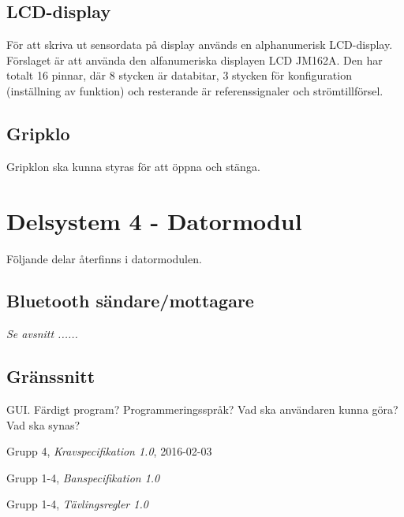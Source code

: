 \documentclass[11pt]{article}
\begin{document}
\begin{flushleft}
\subsection{LCD-display}
För att skriva ut sensordata på display används en alphanumerisk LCD-display. Förslaget är att använda den alfanumeriska displayen LCD JM162A. Den har totalt 16 pinnar, där 8 stycken är databitar, 3 stycken för konfiguration (inställning av funktion) och resterande är referenssignaler och strömtillförsel.

\subsection{Gripklo}
Gripklon ska kunna styras för att öppna och stänga. 

\pagebreak
\section{Delsystem 4 - Datormodul}
Följande delar återfinns i datormodulen.
\subsection{Bluetooth\textsuperscript{\circledR} sändare/mottagare}
\textit{Se avsnitt ......}
\subsection{Gränssnitt}
GUI. Färdigt program? Programmeringsspråk? Vad ska användaren kunna göra? Vad ska synas?

\setcounter{secnumdepth}{0}
\pagebreak
\begin{thebibliography}{9}

  Grupp 4,
  \emph{Kravspecifikation 1.0},
  2016-02-03
  
	Grupp 1-4,
	\emph{Banspecifikation 1.0}
	
	Grupp 1-4,
	\emph{Tävlingsregler 1.0}

\end{thebibliography}

\setcounter{secnumdepth}{2}

\end{flushleft}
\end{document}
